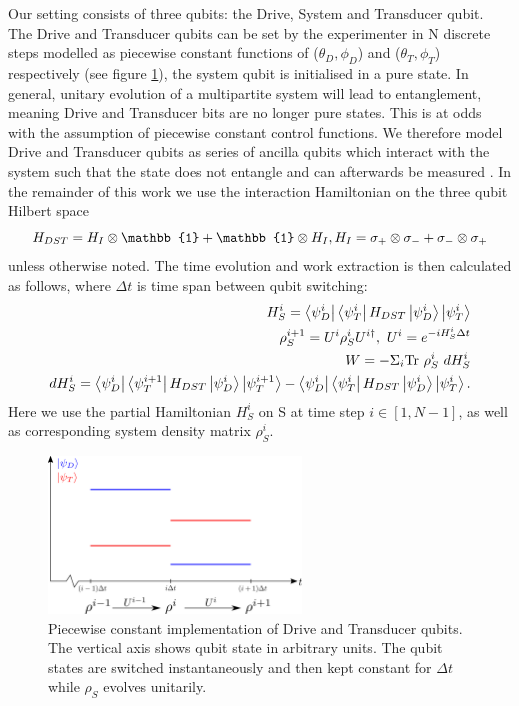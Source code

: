 Our setting consists of three qubits: the Drive, System and Transducer qubit. The Drive and Transducer qubits can be set by the experimenter in N discrete steps modelled as piecewise constant functions of ($\theta_D, \phi_D$) and ($\theta_T, \phi_T$) respectively (see figure \ref{pwc}), the system qubit is initialised in a pure state.
In general, unitary evolution of a multipartite system will lead to entanglement, meaning Drive and Transducer bits are no longer pure states. This is at odds with the assumption of piecewise constant control functions. We therefore model Drive and Transducer qubits as series of ancilla qubits which interact with the system such that the state does not entangle and can afterwards be measured \cite{beyer2020}.
In the remainder of this work we use the interaction Hamiltonian on the three qubit Hilbert space
\begin{equation*}
	H_{DST} = H_{I} \otimes \mathbb{1} + \mathbb{1} \otimes H_{I}, \\
	H_{I} = \sigma_{+} \otimes \sigma_{-} + \sigma_{-} \otimes \sigma_{+}
\end{equation*}
unless otherwise noted.
The time evolution and work extraction is then calculated as follows, where $\Delta t$ is time span between qubit switching:
\begin{align}
	H_S^i = \bra{\psi_D^i}\bra{\psi_T^i} H_{DST} \ket{\psi_D^i} \ket{\psi_T^i} \\
	\rho_S^{i+1} = U^i \rho_S^i U^{i\dagger}, \ U^i = e^{-iH_S^i \Delta t} \\
	W = - \Sigma_i \mathrm{Tr} \ \rho_S^i \ dH_S^i \\
	dH_S^i = \bra{\psi_D^i}\bra{\psi_T^{i+1}} H_{DST} \ket{\psi_D^i} \ket{\psi_T^{i+1}} - \bra{\psi_D^i}\bra{\psi_T^i} H_{DST} \ket{\psi_D^i} \ket{\psi_T^i}.	
\end{align}
Here we use the partial Hamiltonian $H_S^i$ on S at time step $i \in [1, N - 1]$, as well as corresponding system density matrix $\rho_S^i$.

\begin{figure}
	\centering
	\includegraphics[width=0.6\textwidth]{img/pwc}
	\caption{Piecewise constant implementation of Drive and Transducer qubits. The vertical axis shows qubit state in arbitrary units. The qubit states are switched instantaneously and then kept constant for $\Delta t$ while $\rho_S$ evolves unitarily.}
	\label{pwc}
\end{figure}